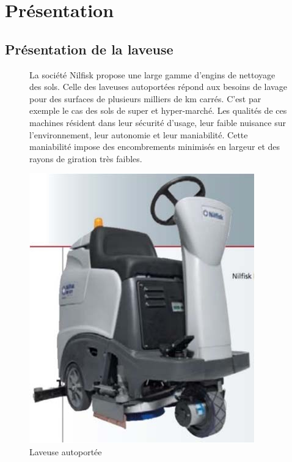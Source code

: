 

\section{Présentation}

\subsection{Présentation de la laveuse}

\begin{figure}[!h]
\begin{minipage}{0.55\linewidth}
La société Nilfisk propose une large gamme d’engins de nettoyage des sols. Celle des laveuses autoportées répond aux besoins de lavage pour des surfaces de plusieurs milliers de km carrés. C’est par exemple le cas des sols de super et hyper-marché. Les qualités de ces machines résident dans leur sécurité d’usage, leur faible nuisance sur l’environnement, leur autonomie et leur maniabilité. Cette maniabilité impose des encombrements minimisés en largeur et des rayons de giration
très faibles.
\end{minipage} \hfill
\begin{minipage}{0.4\linewidth}
\centering\includegraphics[width=0.8\linewidth]{img/img01}
 \caption{Laveuse autoportée}
 \label{img01}
 \end{minipage}
\end{figure}

